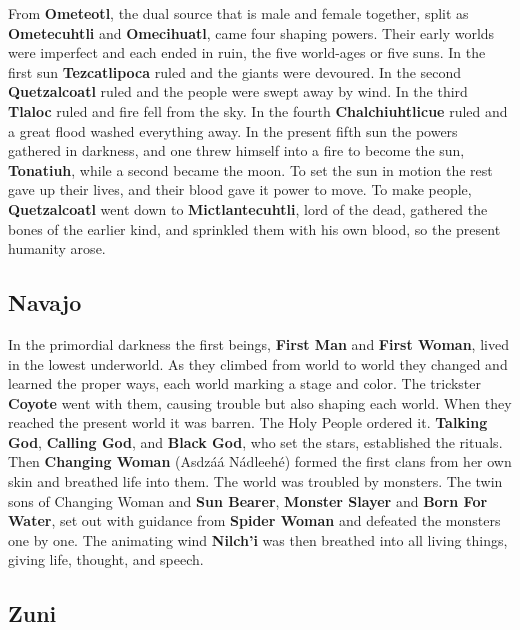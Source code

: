 From \textbf{Ometeotl}, the dual source that is male and female together, split as \textbf{Ometecuhtli} and \textbf{Omecihuatl}, came four shaping powers. Their early worlds were imperfect and each ended in ruin, the five world-ages or five suns. In the first sun \textbf{Tezcatlipoca} ruled and the giants were devoured. In the second \textbf{Quetzalcoatl} ruled and the people were swept away by wind. In the third \textbf{Tlaloc} ruled and fire fell from the sky. In the fourth \textbf{Chalchiuhtlicue} ruled and a great flood washed everything away. In the present fifth sun the powers gathered in darkness, and one threw himself into a fire to become the sun, \textbf{Tonatiuh}, while a second became the moon. To set the sun in motion the rest gave up their lives, and their blood gave it power to move. To make people, \textbf{Quetzalcoatl} went down to \textbf{Mictlantecuhtli}, lord of the dead, gathered the bones of the earlier kind, and sprinkled them with his own blood, so the present humanity arose.

\subsection{Navajo}

In the primordial darkness the first beings, \textbf{First Man} and \textbf{First Woman}, lived in the lowest underworld. As they climbed from world to world they changed and learned the proper ways, each world marking a stage and color. The trickster \textbf{Coyote} went with them, causing trouble but also shaping each world. When they reached the present world it was barren. The Holy People ordered it. \textbf{Talking God}, \textbf{Calling God}, and \textbf{Black God}, who set the stars, established the rituals. Then \textbf{Changing Woman} (Asdz\'a\'a N\'adleeh\'e) formed the first clans from her own skin and breathed life into them. The world was troubled by monsters. The twin sons of Changing Woman and \textbf{Sun Bearer}, \textbf{Monster Slayer} and \textbf{Born For Water}, set out with guidance from \textbf{Spider Woman} and defeated the monsters one by one. The animating wind \textbf{Nilch'i} was then breathed into all living things, giving life, thought, and speech.

\subsection{Zuni}

